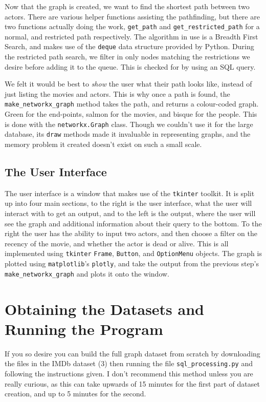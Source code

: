 \documentclass{article}
\begin{document}
Now that the graph is created, we want to find the shortest path between two actors. There are various helper functions assisting the pathfinding, but there are two functions actually doing the work, \verb+get_path+ and \verb+get_restricted_path+ for a normal, and restricted path respectively. The algorithm in use is a Breadth First Search, and makes use of the \verb+deque+ data structure provided by Python. During the restricted path search, we filter in only nodes matching the restrictions we desire before adding it to the queue. This is checked for by using an SQL query.

We felt it would be best to \emph{show} the user what their path looks like, instead of just listing the movies and actors. This is why once a path is found, the \verb!make_networkx_graph! method takes the path, and returns a colour-coded graph. Green for the end-points, salmon for the movies, and bisque for the people. This is done with the \verb+networkx.Graph+ class. Though we couldn't use it for the large database, its \verb!draw! methods made it invaluable in representing graphs, and the memory problem it created doesn't exist on such a small scale.  

\subsection{The User Interface}
The user interface is a window that makes use of the \verb!tkinter! toolkit. It is split up into four main sections, to the right is the user interface, what the user will interact with to get an output, and to the left is the output, where the user will see the graph and additional information about their query to the bottom. To the right the user has the ability to input two actors, and then choose a filter on the recency of the movie, and whether the actor is dead or alive. This is all implemented using \verb!tkinter! \verb!Frame!, \verb!Button!, and \verb!OptionMenu! objects. The graph is plotted using \verb!matplotlib!'s \verb!plotly!, and take the output from the previous step's \verb!make_networkx_graph! and plots it onto the window.

\section{Obtaining the Datasets and Running the Program}
If you so desire you can build the full graph dataset from scratch by downloading the files in the IMDb dataset (3) then running the file \verb!sql_processing.py! and following the instructions given. I don't recommend this method unless you are really curious, as this can take upwards of 15 minutes for the first part of dataset creation, and up to 5 minutes for the second. 
\end{document}
